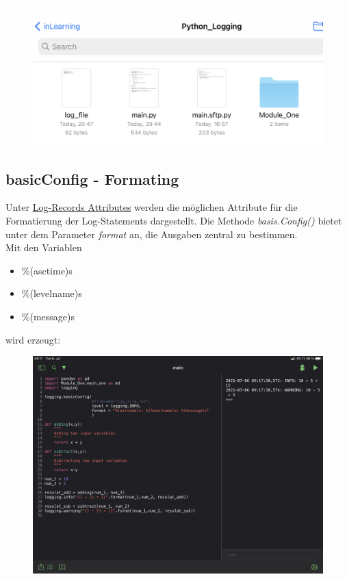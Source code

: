 \begin{figure}[H]
	\centering
	\includegraphics[scale = 0.5]{attachment/chapter_4/Scc028}
\end{figure}

\subsection{basicConfig - Formating}
Unter \href{https://docs.python.org/3/library/logging.html}{Log-Records Attributes} werden die möglichen Attribute für die Formatierung der Log-Statements dargestellt. Die Methode \textit{basis.Config()} bietet unter dem Parameter \textit{format} an, die Ausgaben zentral zu bestimmen. \\

Mit den Variablen 
\begin{itemize}
	\item $\%$(asctime)s
	\item $\%$(levelname)s
	\item $\%$(message)s
\end{itemize}
wird erzeugt: 

\begin{figure}[H]
	\centering
	\includegraphics[scale = 0.5]{attachment/chapter_4/Scc029}
\end{figure}

